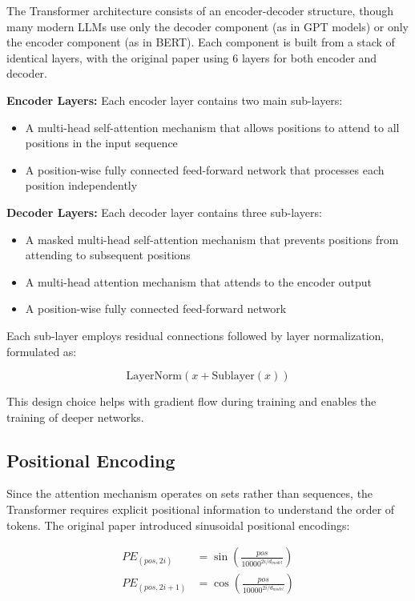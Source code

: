 The Transformer architecture consists of an encoder-decoder structure, though many modern LLMs use only the decoder component (as in GPT models) or only the encoder component (as in BERT). Each component is built from a stack of identical layers, with the original paper using 6 layers for both encoder and decoder.

\textbf{Encoder Layers:} Each encoder layer contains two main sub-layers:
\begin{itemize}
    \item A multi-head self-attention mechanism that allows positions to attend to all positions in the input sequence
    \item A position-wise fully connected feed-forward network that processes each position independently
\end{itemize}

\textbf{Decoder Layers:} Each decoder layer contains three sub-layers:
\begin{itemize}
    \item A masked multi-head self-attention mechanism that prevents positions from attending to subsequent positions
    \item A multi-head attention mechanism that attends to the encoder output
    \item A position-wise fully connected feed-forward network
\end{itemize}

Each sub-layer employs residual connections followed by layer normalization, formulated as:

\begin{equation}
\text{LayerNorm}(x + \text{Sublayer}(x))
\end{equation}

This design choice helps with gradient flow during training and enables the training of deeper networks.

\subsection{Positional Encoding}

Since the attention mechanism operates on sets rather than sequences, the Transformer requires explicit positional information to understand the order of tokens. The original paper introduced sinusoidal positional encodings:

\begin{align}
PE_{(pos, 2i)} &= \sin\left(\frac{pos}{10000^{2i/d_{model}}}\right) \\
PE_{(pos, 2i+1)} &= \cos\left(\frac{pos}{10000^{2i/d_{model}}}\right)
\end{align}


